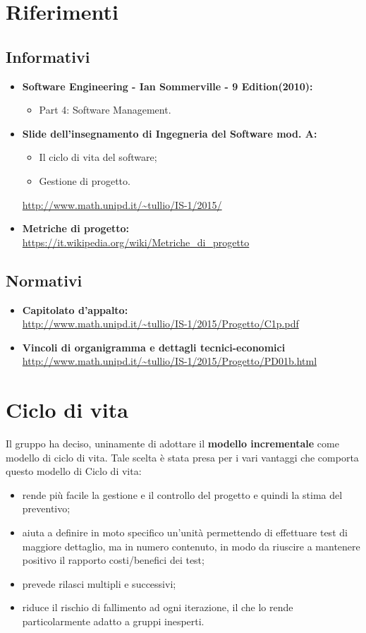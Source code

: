 \documentclass[a4paper]{report}
\begin{document}
		\section{Riferimenti}
			\subsection{Informativi}
				\begin{itemize}
					\item \textbf{Software Engineering - Ian Sommerville - 9 Edition(2010):}
					\begin{itemize}
						\item Part 4: Software Management.
					\end{itemize}
					\item \textbf{Slide dell'insegnamento di Ingegneria del Software mod. A:}
					\begin{itemize}
						\item Il ciclo di vita del software;
						\item Gestione di progetto.
					\end{itemize}
					\url{http://www.math.unipd.it/~tullio/IS-1/2015/}
					\item \textbf{Metriche di progetto:} \\
					\url{https://it.wikipedia.org/wiki/Metriche_di_progetto}
				\end{itemize}
			\subsection{Normativi}
				\begin{itemize}
					\item \textbf{Capitolato d'appalto: } \\ \url{http://www.math.unipd.it/~tullio/IS-1/2015/Progetto/C1p.pdf}
					\item \textbf{Vincoli di organigramma e dettagli tecnici-economici} \\ 
					\url{http://www.math.unipd.it/~tullio/IS-1/2015/Progetto/PD01b.html}
				\end{itemize}
		\section{Ciclo di vita}
			Il gruppo ha deciso, uninamente di adottare il \textbf{modello incrementale} come modello di ciclo di vita.
			Tale scelta è stata presa per i vari vantaggi che comporta questo modello di Ciclo di vita:
			\begin{itemize}
				\item rende più facile la gestione e il controllo del progetto e quindi la stima del preventivo;
				\item aiuta a definire in moto specifico un'unità permettendo di effettuare test di maggiore dettaglio, ma 
				in numero contenuto, in modo da riuscire a mantenere positivo il rapporto costi/benefici dei test;
				\item prevede rilasci multipli e successivi;
				\item riduce il rischio di fallimento ad ogni iterazione, il che lo rende particolarmente adatto a gruppi 
				inesperti.
			\end{itemize}
			
\end{document}
